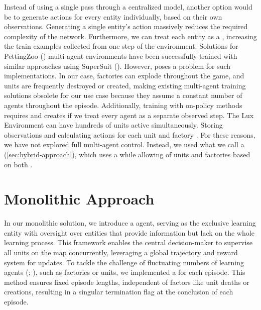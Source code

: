 \bigskip

\noindent Instead of using a single pass through a centralized model, another option would be to generate actions for every entity individually, based on their own observations. Generating a single entity's action massively reduces the required complexity of the network. Furthermore, we can treat each entity as a , increasing the train examples collected from one step of the environment. Solutions for PettingZoo ({\cite{terry2021pettingzoo}}) multi-agent environments have been successfully trained with similar approaches using SuperSuit (\cite{SuperSuit}). However,  poses a problem for such implementations. In our case, factories can explode throughout the game, and units are frequently destroyed or created, making existing multi-agent training solutions obsolete for our use case because they assume a constant number of agents throughout the episode. Additionally, training with on-policy methods requires  and creates  if we treat every agent as a separate observed step. The Lux Environment can have hundreds of units active simultaneously. Storing observations and calculating actions for each unit and factory . For these reasons, we have not explored full multi-agent control. Instead, we used what we call a  (\autoref{sec:hybrid-approach}), which uses a  while allowing  of units and factories based on both .

\section{Monolithic Approach}
\label{sec:monolithic-approach}

\noindent In our monolithic solution, we introduce a  agent, serving as the exclusive learning entity with oversight over entities that provide information but lack  on the whole learning process. This framework enables the central decision-maker to supervise all units on the map concurrently, leveraging a global trajectory and reward system for updates. To tackle the challenge of fluctuating numbers of learning agents (\cite{piccoli2023control}; \cite{SuperSuit}), such as factories or units, we implemented a  for each episode. This method ensures fixed episode lengths, independent of factors like unit deaths or creations, resulting in a singular termination flag at the conclusion of each episode.

